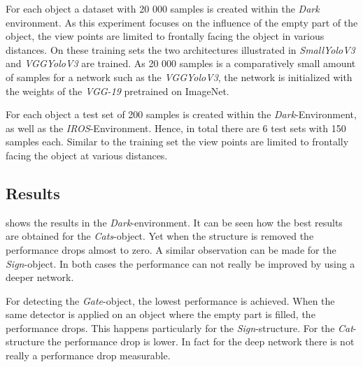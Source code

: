 For each object a dataset with 20 000 samples is created within the \textit{Dark} environment. As this experiment focuses on the influence of the empty part of the object, the view points are limited to frontally facing the object in various distances. On these training sets the two architectures illustrated in  \textit{SmallYoloV3} and \textit{VGGYoloV3} are trained. As 20 000 samples is a comparatively small amount of samples for a network such as the \textit{VGGYoloV3}, the network is initialized with the weights of the \textit{VGG-19} pretrained on ImageNet.

For each object a test set of 200 samples is created within the \textit{Dark}-Environment, as well as the \textit{IROS}-Environment. Hence, in total there are 6 test sets with 150 samples each. Similar to the training set the view points are limited to frontally facing the object at various distances.



\subsection{Results}

\begin{table}[hbtp]
	\centering
	
	\caption{Performance of two architectures when the test environment is similar to the training environment. Each trained network (row) is evaluated on each test set (column). It can be seen how the detectors exploit the structure that is placed in the object. In contrary, the detector of \acp{EWFO} only gets confused when the structure inside the object is very different from the training set.}
	\label{tab:all_basement}
\end{table}

 shows the results in the \textit{Dark}-environment. It can be seen how the best results are obtained for the \textit{Cats}-object. Yet when the structure is removed the performance drops almost to zero. A similar observation can be made for the \textit{Sign}-object. In both cases the performance can not really be improved by using a deeper network.

For detecting the \textit{Gate}-object, the lowest performance is achieved. When the same detector is applied on an object where the empty part is filled, the performance drops. This happens particularly for the \textit{Sign}-structure. For the \textit{Cat}-structure the performance drop is lower. In fact for the deep network there is not really a performance drop measurable.

